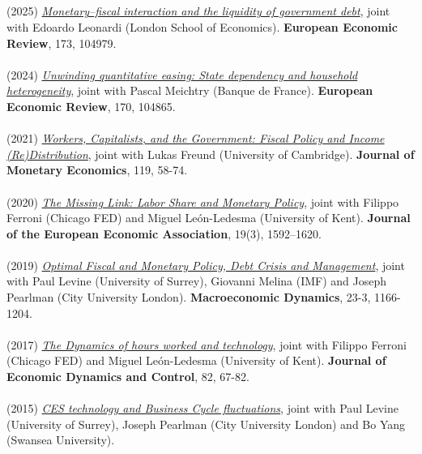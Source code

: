 \documentclass[margin, 11pt]{res} %
\begin{document}
\begin{resume}
\section{}
(2025) \emph{\href{https://www.sciencedirect.com/science/article/pii/S0014292125000297}{Monetary–fiscal interaction and the liquidity of government debt}}, joint with Edoardo Leonardi (London School of Economics).
\textbf{European Economic Review}, 173, 104979.\\
\\
(2024) \emph{\href{https://www.sciencedirect.com/science/article/pii/S0014292124001946?dgcid=author}{Unwinding quantitative easing: State dependency and household heterogeneity}}, joint with Pascal Meichtry (Banque de France).
\textbf{European Economic Review}, 170, 104865.\\
\\
(2021) \emph{\href{https://www.sciencedirect.com/science/article/abs/pii/S0304393221000040}{Workers, Capitalists, and the Government: Fiscal Policy and Income (Re)Distribution}}, joint with Lukas Freund (University of Cambridge).
\textbf{Journal of Monetary Economics}, 119, 58-74.\\
\\
(2020) \emph{\href{https://academic.oup.com/jeea/advance-article/doi/10.1093/jeea/jvaa034/5884931}{The Missing Link: Labor Share and Monetary Policy}}, joint with Filippo Ferroni (Chicago FED) and Miguel Le\'{o}n-Ledesma (University of Kent).
\textbf{Journal of the European Economic Association}, 19(3), 1592–1620.\\
\\
(2019) \emph{\href{https://www.cambridge.org/core/journals/macroeconomic-dynamics/article/optimal-fiscal-and-monetary-policy-debt-crisis-and-management/4E05CEF51FA691092B6EE52ACC807F5E}{Optimal Fiscal and Monetary Policy, Debt Crisis and
Management}}, joint with  Paul Levine (University of Surrey), Giovanni Melina (IMF) and Joseph Pearlman (City University London). \textbf{Macroeconomic Dynamics}, 23-3, 1166-1204.\\
\\
(2017) \emph{\href{http://www.sciencedirect.com/science/article/pii/S016518891730115X}{The Dynamics of hours worked and technology}}, joint with Filippo Ferroni (Chicago FED) and Miguel Le\'{o}n-Ledesma (University of Kent).
\textbf{Journal of Economic Dynamics and Control}, 82, 67-82.\\
\\
(2015) \emph{\href{https://www.sciencedirect.com/science/article/pii/S0165188915001736}{CES technology and Business Cycle fluctuations}}, joint with Paul Levine (University of Surrey), Joseph Pearlman (City University London) and Bo Yang (Swansea University).

\end{resume}
\end{document}
